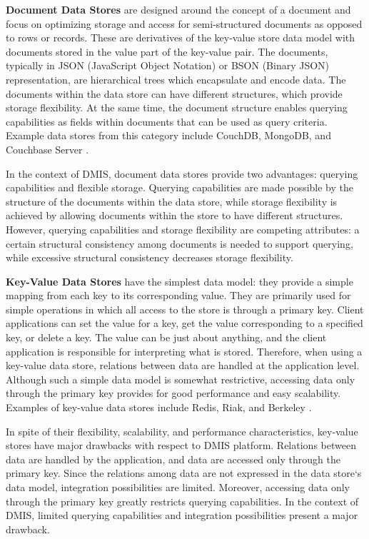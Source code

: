 \textbf{Document Data Stores} are designed around the concept of a document and focus on optimizing storage and access for semi-structured documents as opposed to rows or records. These are derivatives of the key-value store data model with documents stored in the value part of the key-value pair. The documents, typically in JSON (JavaScript Object Notation) or BSON (Binary JSON) representation, are hierarchical trees which encapsulate and encode data. The documents within the data store can have different structures, which provide storage flexibility. At the same time, the document structure enables querying capabilities as fields within documents that can be used as query criteria. Example data stores from this category  include CouchDB, MongoDB, and Couchbase Server \cite{sadalage2013nosql}.

In the context of DMIS, document data stores provide two advantages: querying capabilities and flexible storage. Querying capabilities are made possible by the structure of the documents within the data store,  while storage  flexibility is  achieved by allowing documents  within the  store to  have  different  structures.  However,  querying  capabilities and storage flexibility are competing  attributes:  a  certain  structural  consistency  among documents is needed to support querying, while excessive structural consistency decreases storage flexibility.

\textbf{Key-Value Data Stores} have the simplest data model: they provide a simple mapping from each key to its corresponding value. They are primarily used for simple operations in which all access to the store is through a primary key. Client applications can set the value for a key, get the value corresponding to a specified key, or delete a key. The value can be just about anything, and the client application is responsible for interpreting what is stored. Therefore, when using a key-value data store, relations between data are handled at the application level. Although such a simple data model is somewhat restrictive, accessing data only through the primary key provides for good performance and easy scalability. Examples of key-value data stores include Redis, Riak, and Berkeley \cite{sadalage2013nosql}. 

In spite of their flexibility, scalability, and performance characteristics, key-value stores have major drawbacks with respect to DMIS platform. Relations between data are handled by the application, and data are accessed only through the primary key. Since the relations among data are not expressed in the data store‘s data model, integration possibilities are limited. Moreover, accessing data only through the primary key greatly restricts  querying  capabilities. In  the  context  of  DMIS, limited querying capabilities and integration possibilities present a major drawback.

